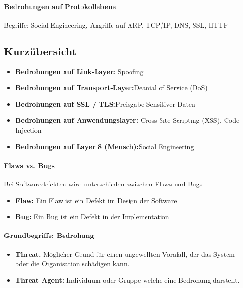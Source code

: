 \documentclass[10pt,a4paper]{article}
\begin{document}
\paragraph*{Bedrohungen auf Protokollebene}Begriffe: Social Engineering, Angriffe auf ARP, TCP/IP, DNS, SSL, HTTP

\subsection*{Kurzübersicht}
\begin{itemize}[noitemsep,topsep=0pt,leftmargin=*]
    \item \textbf{Bedrohungen auf Link-Layer:} Spoofing
    \item \textbf{Bedrohungen auf Transport-Layer:}Deanial of Service (DoS)
    \item \textbf{Bedrohungen auf SSL / TLS:}Preisgabe Sensitiver Daten
    \item \textbf{Bedrohungen auf Anwendungslayer:} Cross Site Scripting (XSS), Code Injection
    \item \textbf{Bedrohungen auf Layer 8 (Mensch):}Social Engineering
\end{itemize}


\paragraph*{Flaws vs. Bugs} Bei Softwaredefekten wird unterschieden zwischen Flaws und Bugs
\begin{itemize}[noitemsep,topsep=0pt,leftmargin=*]
    \item \textbf{Flaw:} Ein Flaw ist ein Defekt im Design der Software
    \item \textbf{Bug:} Ein Bug ist ein Defekt in der Implementation
\end{itemize}

\paragraph*{Grundbegriffe: Bedrohung}
\begin{itemize}[noitemsep,topsep=0pt,leftmargin=*]
    \item \textbf{Threat:} Möglicher Grund für einen ungewollten Vorafall, der das System oder die Organisation schädigen kann.
    \item \textbf{Threat Agent:} Individuum oder Gruppe welche eine Bedrohung darstellt.
\end{itemize}
\end{document}
